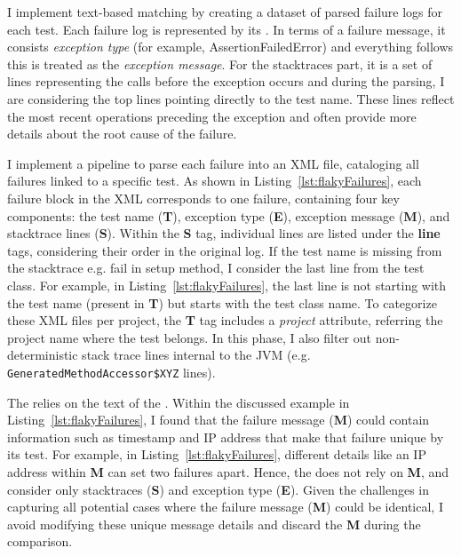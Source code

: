 I implement text-based matching by creating a dataset of parsed failure logs for each test.
Each failure log is represented by its \failure.
In terms of a failure message, it consists  \emph{exception type} (for example, AssertionFailedError) and everything follows this is treated as the \emph{exception message}. For the stacktraces part, it is a set of lines representing the calls before the exception occurs and during the parsing, I are considering the top lines pointing directly to the test name. These lines reflect the most recent operations preceding the exception and often provide more details about the root cause of the failure.

I implement a pipeline to parse each failure into an XML file, cataloging all failures linked to a specific test.
As shown in Listing~\ref{lst:flakyFailures}, each failure block in the XML corresponds to one failure, containing four key components: the test name (\textbf{T}), exception type (\textbf{E}), exception message (\textbf{M}), and stacktrace lines (\textbf{S}). Within the \textbf{S} tag, individual lines are listed under the \textbf{line} tags, considering their order in the original log.
If the test name is missing from the stacktrace e.g. fail in setup method, I consider the last line from the test class. For example, in Listing~\ref{lst:flakyFailures}, the last line is not starting with the test name (present in \textbf{T}) but starts with the test class name. To categorize these XML files per project, the \textbf{T} tag includes a \emph{project} attribute, referring the project name where the test belongs.
In this phase, I also filter out non-deterministic stack trace lines internal to the JVM (e.g. \texttt{GeneratedMethodAccessor\$XYZ} lines).



The \syntax relies on the text of the \failure. Within the discussed example in Listing~\ref{lst:flakyFailures}, I found that the failure message (\textbf{M}) could contain information such as timestamp and IP address that make that failure unique by its test.
For example, in Listing~\ref{lst:flakyFailures}, different details like an IP address within \textbf{M} can set two failures apart.
Hence, the \syntax does not rely on \textbf{M}, and consider only stacktraces (\textbf{S}) and exception type (\textbf{E}).
Given the challenges in capturing all potential cases where the failure message (\textbf{M}) could be identical, I avoid modifying these unique message details and discard the \textbf{M} during the comparison. 

